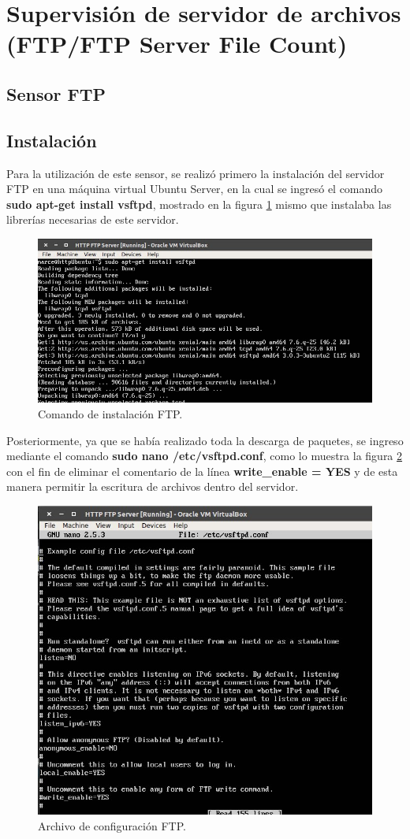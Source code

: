 \section{Supervisión de servidor de archivos (FTP/FTP Server File Count)}
\subsection{Sensor FTP}
\subsection{Instalación}
Para la utilización de este sensor, se realizó primero la instalación del servidor FTP en una máquina virtual Ubuntu Server, en la cual se ingresó el comando \textbf{sudo apt-get install vsftpd}, mostrado en la figura \ref{image:ftp1} mismo que instalaba las librerías necesarias de este servidor.

\FloatBarrier
\begin{figure}[htbp!]
		\centering
			\includegraphics[width=.9 \textwidth]{images/ftp1}
		\caption{Comando de instalación FTP.}
		\label{image:ftp1}
\end{figure}
\FloatBarrier

Posteriormente, ya que se había realizado toda la descarga de paquetes, se ingreso mediante el comando \textbf{sudo nano /etc/vsftpd.conf}, como lo muestra la figura \ref{image:ftp2} con el fin de eliminar el comentario de la línea \textbf{write\_enable = YES} y de esta manera permitir la escritura de archivos dentro del servidor.

\FloatBarrier
\begin{figure}[htbp!]
		\centering
			\includegraphics[width=.75 \textwidth]{images/ftp2}
		\caption{Archivo de configuración FTP.}
		\label{image:ftp2}
\end{figure}
\FloatBarrier

